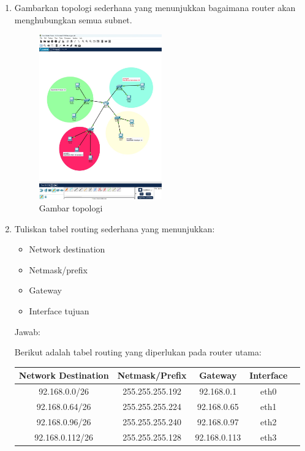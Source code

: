 \begin{enumerate}
\item Gambarkan topologi sederhana yang menunjukkan bagaimana router akan menghubungkan semua subnet.
\begin{figure}[h!]
  \centering
  \includegraphics[width=0.5\textwidth]{P1/img/2.jpg}
  \caption{Gambar topologi}
\end{figure}
\item Tuliskan tabel routing sederhana yang menunjukkan:
\begin{itemize}
        \item Network destination
        \item Netmask/prefix
        \item Gateway
        \item Interface tujuan
    \end{itemize}

    Jawab:
    
    Berikut adalah tabel routing yang diperlukan pada router utama:
\begin{center}
\begin{tabular}{ |c|c|c|c|c| } 
\hline
Network Destination & Netmask/Prefix & Gateway & Interface\\
\hline
92.168.0.0/26 & 255.255.255.192 & 92.168.0.1 & eth0  \\
92.168.0.64/26 & 255.255.255.224 & 92.168.0.65 & eth1  \\
92.168.0.96/26 & 255.255.255.240 & 92.168.0.97 & eth2  \\
92.168.0.112/26 & 255.255.255.128 & 92.168.0.113 & eth3  \\
\hline
\end{tabular}
\end{center}


\end{enumerate}
